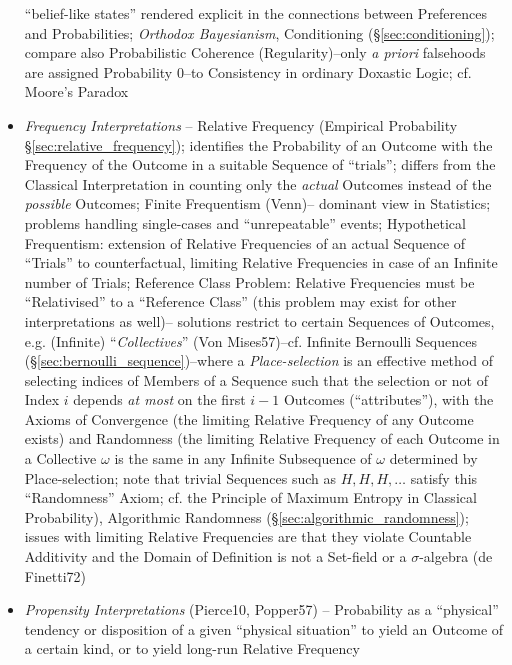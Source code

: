 \begin{itemize}
    ``belief-like states'' rendered explicit in the connections between
    Preferences and Probabilities;
    \emph{Orthodox Bayesianism}, Conditioning (\S\ref{sec:conditioning});
    compare also Probabilistic Coherence (Regularity)--only \emph{a priori}
    falsehoods are assigned Probability 0--to Consistency in ordinary Doxastic
    Logic; cf. Moore's Paradox
  \item \emph{Frequency Interpretations} -- Relative Frequency (Empirical
    Probability \S\ref{sec:relative_frequency}); identifies the Probability of
    an Outcome with the Frequency of the Outcome in a suitable Sequence of
    ``trials''; differs from the Classical Interpretation in counting only the
    \emph{actual} Outcomes instead of the \emph{possible} Outcomes; Finite
    Frequentism (Venn)-- dominant view in Statistics; problems handling
    single-cases and ``unrepeatable'' events; Hypothetical Frequentism:
    extension of Relative Frequencies of an actual Sequence of ``Trials'' to
    counterfactual, limiting Relative Frequencies in case of an Infinite number
    of Trials; Reference Class Problem: Relative Frequencies must be
    ``Relativised'' to a ``Reference Class'' (this problem may exist for other
    interpretations as well)-- solutions restrict to certain Sequences of
    Outcomes, e.g. (Infinite) ``\emph{Collectives}'' (Von Mises57)--cf. Infinite
    Bernoulli Sequences (\S\ref{sec:bernoulli_sequence})--where a
    \emph{Place-selection} is an effective method of selecting indices of
    Members of a Sequence such that the selection or not of Index $i$ depends
    \emph{at most} on the first $i-1$ Outcomes (``attributes''), with the Axioms
    of Convergence (the limiting Relative Frequency of any Outcome exists) and
    Randomness (the limiting Relative Frequency of each Outcome in a Collective
    $\omega$ is the same in any Infinite Subsequence of $\omega$ determined by
    Place-selection; note that trivial Sequences such as $H,H,H,\ldots$ satisfy
    this ``Randomness'' Axiom; cf. the Principle of Maximum Entropy in Classical
    Probability), Algorithmic Randomness (\S\ref{sec:algorithmic_randomness});
    issues with limiting Relative Frequencies are that they violate Countable
    Additivity and the Domain of Definition is not a Set-field or a
    $\sigma$-algebra (de Finetti72)
  \item \emph{Propensity Interpretations} (Pierce10, Popper57) -- Probability as
    a ``physical'' tendency or disposition of a given ``physical situation'' to
    yield an Outcome of a certain kind, or to yield long-run Relative Frequency

\end{itemize}

